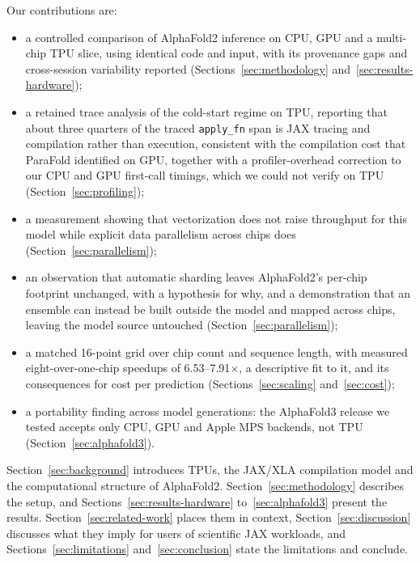 Our contributions are:
\begin{itemize}
  \item a controlled comparison of AlphaFold2 inference on CPU, GPU and
    a multi-chip TPU slice, using identical code and input, with its
    provenance gaps and cross-session variability reported
    (Sections~\ref{sec:methodology} and~\ref{sec:results-hardware});
  \item a retained trace analysis of the cold-start regime on TPU,
    reporting that about three quarters of the traced \texttt{apply\_fn}
    span is JAX tracing and compilation rather than execution, consistent
    with the compilation cost that ParaFold identified on GPU,
    together with a profiler-overhead correction to our CPU and GPU
    first-call timings, which we could not verify on TPU
    (Section~\ref{sec:profiling});
  \item a measurement showing that vectorization does not raise
    throughput for this model while explicit data parallelism across
    chips does (Section~\ref{sec:parallelism});
  \item an observation that automatic sharding leaves AlphaFold2's
    per-chip footprint unchanged, with a hypothesis for why, and a
    demonstration that an
    ensemble can instead be built outside the model and mapped across
    chips, leaving the model source untouched
    (Section~\ref{sec:parallelism});
  \item a matched 16-point grid over chip count and sequence length,
    with measured eight-over-one-chip speedups of 6.53--7.91$\times$, a
    descriptive fit to it, and its consequences for cost per prediction
    (Sections~\ref{sec:scaling} and~\ref{sec:cost});
  \item a portability finding across model generations: the
    AlphaFold3 release we tested accepts only CPU, GPU and Apple MPS
    backends, not TPU (Section~\ref{sec:alphafold3}).
\end{itemize}

Section~\ref{sec:background} introduces TPUs, the JAX/XLA compilation
model and the computational structure of AlphaFold2.
Section~\ref{sec:methodology} describes the setup, and
Sections~\ref{sec:results-hardware} to~\ref{sec:alphafold3} present the
results. Section~\ref{sec:related-work} places them in context,
Section~\ref{sec:discussion} discusses what they imply for users of
scientific JAX workloads, and Sections~\ref{sec:limitations}
and~\ref{sec:conclusion} state the limitations and conclude.
